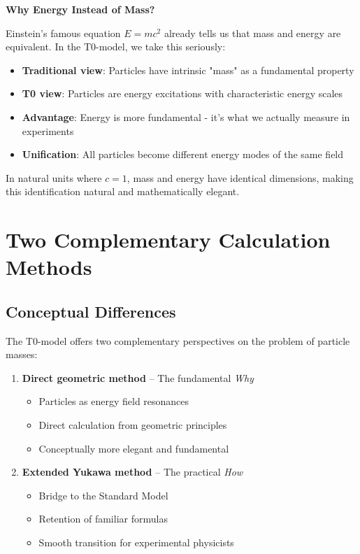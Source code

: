 \documentclass[12pt,a4paper]{article}
\begin{document}
	\textbf{Why Energy Instead of Mass?}
	
	Einstein's famous equation $E = mc^2$ already tells us that mass and energy are equivalent. In the T0-model, we take this seriously:
	
	\begin{itemize}
		\item \textbf{Traditional view}: Particles have intrinsic "mass" as a fundamental property
		\item \textbf{T0 view}: Particles are energy excitations with characteristic energy scales
		\item \textbf{Advantage}: Energy is more fundamental - it's what we actually measure in experiments
		\item \textbf{Unification}: All particles become different energy modes of the same field
	\end{itemize}
	
	In natural units where $c = 1$, mass and energy have identical dimensions, making this identification natural and mathematically elegant.
	
	\section{Two Complementary Calculation Methods}
	\label{sec:two_calculation_methods}
	
	\subsection{Conceptual Differences}
	\label{subsec:conceptual_differences}
	
	The T0-model offers two complementary perspectives on the problem of particle masses:
	
	\begin{enumerate}
		\item \textbf{Direct geometric method} -- The fundamental \textit{Why}
		\begin{itemize}
			\item Particles as energy field resonances
			\item Direct calculation from geometric principles
			\item Conceptually more elegant and fundamental
		\end{itemize}
		
		\item \textbf{Extended Yukawa method} -- The practical \textit{How}
		\begin{itemize}
			\item Bridge to the Standard Model
			\item Retention of familiar formulas
			\item Smooth transition for experimental physicists
		\end{itemize}
	\end{enumerate}
	
\end{document}
